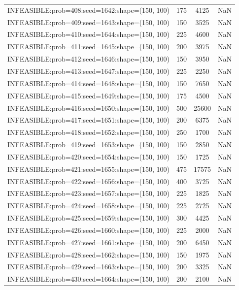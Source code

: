 \begin{longtable}{lccc}
INFEASIBLE:prob=408:seed=1642:shape=(150, 100) &      175 &  4125 &    NaN \\
INFEASIBLE:prob=409:seed=1643:shape=(150, 100) &      150 &  3525 &    NaN \\
INFEASIBLE:prob=410:seed=1644:shape=(150, 100) &      225 &  4600 &    NaN \\
INFEASIBLE:prob=411:seed=1645:shape=(150, 100) &      200 &  3975 &    NaN \\
INFEASIBLE:prob=412:seed=1646:shape=(150, 100) &      150 &  3950 &    NaN \\
INFEASIBLE:prob=413:seed=1647:shape=(150, 100) &      225 &  2250 &    NaN \\
INFEASIBLE:prob=414:seed=1648:shape=(150, 100) &      150 &  7650 &    NaN \\
INFEASIBLE:prob=415:seed=1649:shape=(150, 100) &      175 &  4500 &    NaN \\
INFEASIBLE:prob=416:seed=1650:shape=(150, 100) &      500 & 25600 &    NaN \\
INFEASIBLE:prob=417:seed=1651:shape=(150, 100) &      200 &  6375 &    NaN \\
INFEASIBLE:prob=418:seed=1652:shape=(150, 100) &      250 &  1700 &    NaN \\
INFEASIBLE:prob=419:seed=1653:shape=(150, 100) &      150 &  2850 &    NaN \\
INFEASIBLE:prob=420:seed=1654:shape=(150, 100) &      150 &  1725 &    NaN \\
INFEASIBLE:prob=421:seed=1655:shape=(150, 100) &      475 & 17575 &    NaN \\
INFEASIBLE:prob=422:seed=1656:shape=(150, 100) &      400 &  3725 &    NaN \\
INFEASIBLE:prob=423:seed=1657:shape=(150, 100) &      225 &  1825 &    NaN \\
INFEASIBLE:prob=424:seed=1658:shape=(150, 100) &      225 &  2725 &    NaN \\
INFEASIBLE:prob=425:seed=1659:shape=(150, 100) &      300 &  4425 &    NaN \\
INFEASIBLE:prob=426:seed=1660:shape=(150, 100) &      225 &  2000 &    NaN \\
INFEASIBLE:prob=427:seed=1661:shape=(150, 100) &      200 &  6450 &    NaN \\
INFEASIBLE:prob=428:seed=1662:shape=(150, 100) &      150 &  1975 &    NaN \\
INFEASIBLE:prob=429:seed=1663:shape=(150, 100) &      200 &  3325 &    NaN \\
INFEASIBLE:prob=430:seed=1664:shape=(150, 100) &      200 &  2100 &    NaN \\

\end{longtable}
